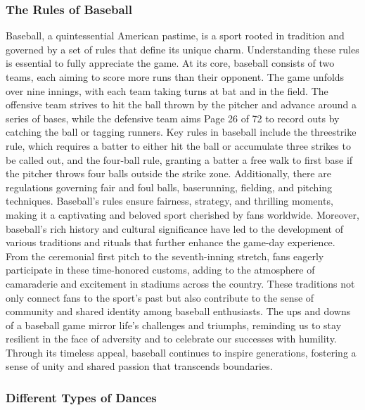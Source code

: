 \documentclass[
  letterpaper,
  DIV=11,
  numbers=noendperiod]{scrartcl}
\begin{document}
\subsubsection{The Rules of Baseball}\label{the-rules-of-baseball}

Baseball, a quintessential American pastime, is a sport rooted in
tradition and governed by a set of rules that define its unique charm.
Understanding these rules is essential to fully appreciate the game. At
its core, baseball consists of two teams, each aiming to score more runs
than their opponent. The game unfolds over nine innings, with each team
taking turns at bat and in the field. The offensive team strives to hit
the ball thrown by the pitcher and advance around a series of bases,
while the defensive team aims Page 26 of 72 to record outs by catching
the ball or tagging runners. Key rules in baseball include the
threestrike rule, which requires a batter to either hit the ball or
accumulate three strikes to be called out, and the four-ball rule,
granting a batter a free walk to first base if the pitcher throws four
balls outside the strike zone. Additionally, there are regulations
governing fair and foul balls, baserunning, fielding, and pitching
techniques. Baseball's rules ensure fairness, strategy, and thrilling
moments, making it a captivating and beloved sport cherished by fans
worldwide. Moreover, baseball's rich history and cultural significance
have led to the development of various traditions and rituals that
further enhance the game-day experience. From the ceremonial first pitch
to the seventh-inning stretch, fans eagerly participate in these
time-honored customs, adding to the atmosphere of camaraderie and
excitement in stadiums across the country. These traditions not only
connect fans to the sport's past but also contribute to the sense of
community and shared identity among baseball enthusiasts. The ups and
downs of a baseball game mirror life's challenges and triumphs,
reminding us to stay resilient in the face of adversity and to celebrate
our successes with humility. Through its timeless appeal, baseball
continues to inspire generations, fostering a sense of unity and shared
passion that transcends boundaries.

\subsubsection{Different Types of
Dances}\label{different-types-of-dances}
\end{document}
